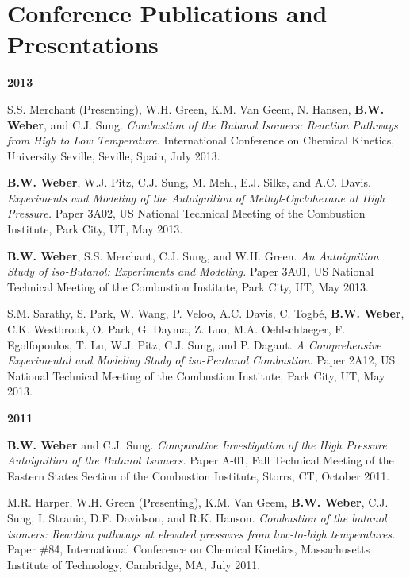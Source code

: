 \section{Conference Publications and Presentations}

\begin{bibsection}
\item[] \textbf{2013}
\item[] S.S. Merchant (Presenting), W.H. Green, K.M. Van Geem, N.
        Hansen, \textbf{B.W. Weber}, and C.J. Sung.
        \textit{Combustion of the Butanol Isomers: Reaction Pathways
        from High to Low Temperature.}  International
        Conference on Chemical Kinetics, University Seville, Seville,
        Spain, July 2013.

\item[] \textbf{B.W. Weber}, W.J. Pitz, C.J. Sung, M. Mehl,
        E.J. Silke, and A.C. Davis. \textit{Experiments and Modeling of
        the Autoignition of Methyl-Cyclohexane at High Pressure.}
        Paper 3A02,  US National Technical Meeting of the
        Combustion Institute, Park City, UT, May 2013.

\item[] \textbf{B.W. Weber}, S.S. Merchant, C.J. Sung, and W.H. Green.
        \textit{An Autoignition Study of iso-Butanol: Experiments and
        Modeling.} Paper 3A01,  US National Technical
        Meeting of the Combustion Institute, Park City, UT, May 2013.

\item[] S.M. Sarathy, S. Park, W. Wang, P. Veloo, A.C. Davis,
        C. Togbé, \textbf{B.W. Weber}, C.K. Westbrook, O. Park,
        G. Dayma, Z. Luo, M.A. Oehlschlaeger, F. Egolfopoulos, T. Lu,
        W.J. Pitz, C.J. Sung, and P. Dagaut. \textit{A Comprehensive
        Experimental and Modeling Study of iso-Pentanol Combustion.}
        Paper 2A12,  US National Technical Meeting of the
        Combustion Institute, Park City, UT, May 2013.

\item[] \textbf{2011}
\item[] \textbf{B.W. Weber} and C.J. Sung. \textit{Comparative
        Investigation of the High Pressure Autoignition of the Butanol
        Isomers.} Paper A-01, Fall Technical Meeting of the Eastern
        States Section of the Combustion Institute, Storrs, CT, October
        2011.

\item[] M.R. Harper, W.H. Green (Presenting), K.M. Van Geem,
        \textbf{B.W. Weber}, C.J. Sung, I. Stranic, D.F. Davidson,
        and R.K. Hanson. \textit{Combustion of the butanol isomers:
        Reaction pathways at elevated pressures from low-to-high
        temperatures.} Paper \#84,  International
        Conference on Chemical Kinetics, Massachusetts Institute of
        Technology, Cambridge, MA, July 2011.


\end{bibsection}
